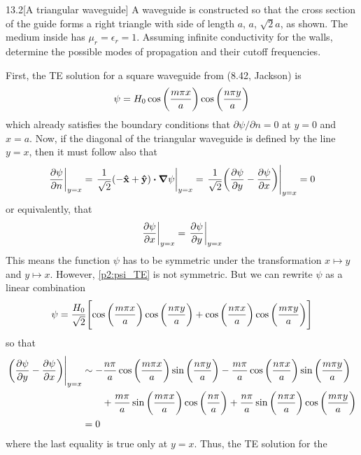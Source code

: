 \documentclass[12pt]{article}
\begin{document}
\begin{problem}{13.2}[A triangular waveguide]
A waveguide is constructed so that the cross section of the guide forms a right
triangle with side of length $a$, $a$, $\sqrt2a$, as shown. The medium inside
has $\mu_r=\epsilon_r=1$. Assuming infinite conductivity for the walls,
determine the possible modes of propagation and their cutoff frequencies.
\begin{solution}
First, the TE solution for a square waveguide from (8.42, Jackson) is
\begin{equation}\label{p2:psi_TE}
    \psi=H_0\cos\qty(\frac{m\pi x}{a})\cos\qty(\frac{n\pi y}{a}) 
\end{equation}
which already satisfies the boundary conditions that $\partial\psi/\partial n=0$
at $y=0$ and $x=a$. Now, if the diagonal of the triangular waveguide is defined
by the line $y=x$, then it must follow also that
\begin{equation}
    \eval{\frac{\partial\psi}{\partial n}}_{y=x}
    =\eval{\frac1{\sqrt2}(-\xhat+\yhat)\vdot\grad\psi}_{y=x}
    =\eval{\frac1{\sqrt{2}}\qty(\frac{\partial\psi}{\partial
    y}-\frac{\partial\psi}{\partial x})}_{y=x}=0
\end{equation}
or equivalently, that
\begin{equation}
    \eval{\frac{\partial\psi}{\partial x}}_{y=x}
    =\eval{\frac{\partial\psi}{\partial y}}_{y=x} 
\end{equation}
This means the function $\psi$ has to be symmetric under the
transformation $x\mapsto y$ and $y\mapsto x$. However, \eqref{p2:psi_TE} is not
symmetric. But we can rewrite $\psi$ as a linear combination
\begin{equation}\label{p2:tri_TE}
    \psi=\frac{H_0}{\sqrt{2}}\qty[\cos\qty(\frac{m\pi
    x}{a})\cos\qty(\frac{n\pi y}{a})+\cos\qty(\frac{n\pi
x}{a})\cos\qty(\frac{m\pi y}{a})] 
\end{equation}
so that
\begin{align}
    \eval{\qty(\frac{\partial\psi}{\partial y}-\frac{\partial\psi}{\partial
    x})}_{y=x}
    &\sim-\frac{n\pi}{a}\cos\qty(\frac{m\pi x}{a})\sin\qty(\frac{n\pi y}{a})
    -\frac{m\pi}{a}\cos\qty(\frac{n\pi x}{a})\sin\qty(\frac{m\pi y}{a})\notag\\
    &\qquad+\frac{m\pi}{a}\sin\qty(\frac{m\pi x}{a})\cos\qty(\frac{n\pi}{a})
    +\frac{n\pi}{a}\sin\qty(\frac{n\pi x}{a})\cos\qty(\frac{m\pi y}{a})\notag\\
    &=0
\end{align}
where the last equality is true only at $y=x$. Thus, the TE solution for the

\end{solution}
\end{problem}
\end{document}
